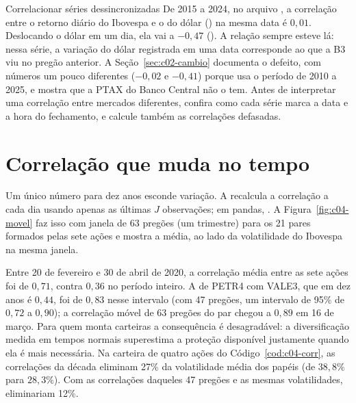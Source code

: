 \begin{armadilha}{Correlacionar séries dessincronizadas}
De 2015 a 2024, no arquivo , a correlação entre o retorno diário do Ibovespa e o do dólar () na mesma data é $0,01$. Deslocando o dólar em um dia, ela vai a $-0,47$ (). A relação sempre esteve lá: nessa série, a variação do dólar registrada em uma data corresponde ao que a B3 viu no pregão anterior. A Seção~\ref{sec:c02-cambio} documenta o defeito, com números um pouco diferentes ($-0,02$ e $-0,41$) porque usa o período de 2010 a 2025, e mostra que a PTAX do Banco Central não o tem. Antes de interpretar uma correlação entre mercados diferentes, confira como cada série marca a data e a hora do fechamento, e calcule também as correlações defasadas.
\end{armadilha}

\section{Correlação que muda no tempo}
\label{sec:c04-movel}

Um único número para dez anos esconde variação. A  recalcula a correlação a cada dia usando apenas as últimas $J$ observações; em pandas, . A Figura~\ref{fig:c04-movel} faz isso com janela de 63 pregões (um trimestre) para os 21 pares formados pelas sete ações e mostra a média, ao lado da volatilidade do Ibovespa na mesma janela.


Entre 20 de fevereiro e 30 de abril de 2020, a correlação média entre as sete ações foi de $0,71$, contra $0,36$ no período inteiro. A de PETR4 com VALE3, que em dez anos é $0,44$, foi de $0,83$ nesse intervalo (com 47 pregões, um intervalo de 95\% de $0,72$ a $0,90$); a correlação móvel de 63 pregões do par chegou a $0,89$ em 16 de março. Para quem monta carteiras a consequência é desagradável: a diversificação medida em tempos normais superestima a proteção disponível justamente quando ela é mais necessária. Na carteira de quatro ações do Código~\ref{cod:c04-corr}, as correlações da década eliminam 27\% da volatilidade média dos papéis (de $38,8\%$ para $28,3\%$). Com as correlações daqueles 47 pregões e as mesmas volatilidades, eliminariam 12\%.

